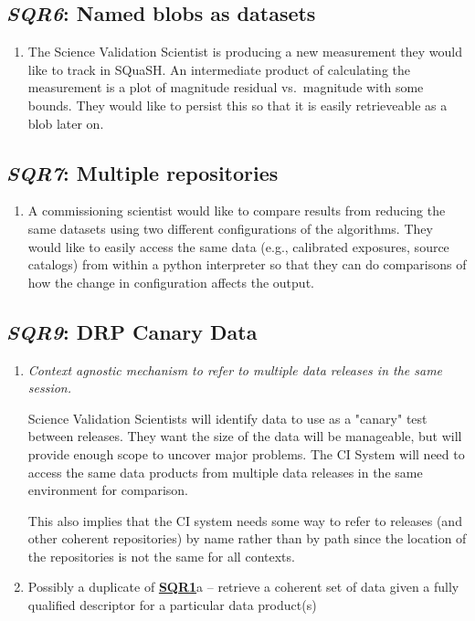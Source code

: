 \documentclass[DM,toc,lsstdraft]{lsstdoc}
\newcommand{\usecase}[3]{%
\subsection{\emph{#1}: #2}
\label{use:#1}
\begin{enumerate}[label=\alph*.]
#3
\end{enumerate}
}
\newcommand{\useref}[1]{\hyperref[use:#1]{\textcolor{lsstblue}{\textbf{#1}}}}
\begin{document}
\usecase{SQR6}{Named blobs as datasets}{%

\item
The Science Validation Scientist is producing a new measurement they would like to track in SQuaSH.
An intermediate product of calculating the measurement is a plot of magnitude residual vs.\ magnitude with some bounds.
They would like to persist this so that it is easily retrieveable as a blob later on.

}

\usecase{SQR7}{Multiple repositories}{%

\item
A commissioning scientist would like to compare results from reducing the same datasets using two different configurations of the algorithms.
They would like to easily access the same data (e.g., calibrated exposures, source catalogs) from within a python interpreter so that they can do comparisons of how the change in configuration affects the output.

}

\usecase{SQR9}{DRP Canary Data}{%

\item
\emph{Context agnostic mechanism to refer to multiple data releases in the same session.}

Science Validation Scientists will identify data to use as a "canary" test between releases. They want the size of the data will be manageable, but will provide enough scope to uncover major problems.
The CI System will need to access the same data products from multiple data releases in the same environment for comparison.

This also implies that the CI system needs some way to refer to releases (and other coherent repositories) by name rather than by path since the location of the repositories is not the same for all contexts.

\item
Possibly a duplicate of \useref{SQR1}a -- retrieve a coherent set of data given a fully qualified descriptor for a particular data product(s)

}
\end{document}
